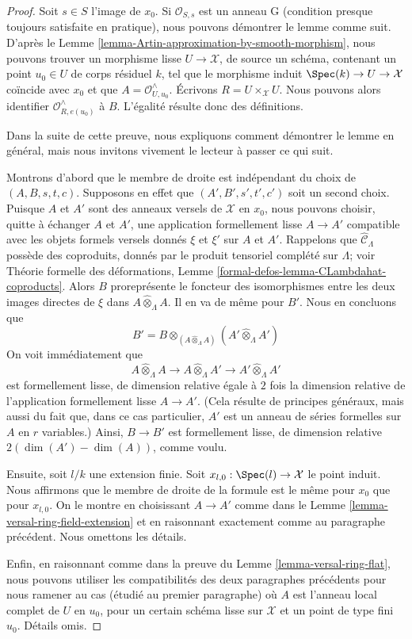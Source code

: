 \begin{proof}
Soit $s \in S$ l'image de $x_0$. Si $\mathcal{O}_{S, s}$
est un anneau G (condition presque toujours satisfaite en pratique),
nous pouvons démontrer le lemme comme suit.
D'après le Lemme \ref{lemma-Artin-approximation-by-smooth-morphism},
nous pouvons trouver un morphisme lisse $U \to \mathcal{X}$, de source un schéma,
contenant un point $u_0 \in U$ de corps résiduel $k$, tel que le
morphisme induit $\Spec(k) \to U \to \mathcal{X}$ coïncide avec $x_0$
et que $A = \mathcal{O}_{U, u_0}^\wedge$.
Écrivons $R = U \times_\mathcal{X} U$. Nous pouvons alors identifier
$\mathcal{O}_{R, e(u_0)}^\wedge$ à $B$.
L'égalité résulte donc des définitions.

\medskip\noindent
Dans la suite de cette preuve, nous expliquons comment démontrer le lemme en
général, mais nous invitons vivement le lecteur à passer ce qui suit.

\medskip\noindent
Montrons d'abord que le membre de droite est indépendant du choix
de $(A, B, s, t, c)$. Supposons en effet que $(A', B', s', t', c')$
soit un second choix. Puisque $A$ et $A'$ sont des anneaux versels de $\mathcal{X}$
en $x_0$, nous pouvons choisir, quitte à échanger $A$ et $A'$,
une application formellement lisse $A \to A'$ compatible avec les objets formels
versels donnés $\xi$ et $\xi'$ sur $A$ et $A'$.
Rappelons que $\widehat{\mathcal{C}}_\Lambda$ possède
des coproduits, donnés par le produit tensoriel complété
sur $\Lambda$; voir Théorie formelle des déformations, Lemme
\ref{formal-defos-lemma-CLambdahat-coproducts}.
Alors $B$ proreprésente le foncteur des isomorphismes entre les
deux images directes de $\xi$ dans $A \widehat{\otimes}_\Lambda A$.
Il en va de même pour $B'$. Nous en concluons que
$$
B' =
B \otimes_{(A \widehat{\otimes}_\Lambda A)}
(A' \widehat{\otimes}_\Lambda A')
$$
On voit immédiatement que
$$
A \widehat{\otimes}_\Lambda A \longrightarrow
A \widehat{\otimes}_\Lambda A' \longrightarrow
A' \widehat{\otimes}_\Lambda A'
$$
est formellement lisse, de dimension relative égale à $2$ fois la
dimension relative de l'application formellement lisse $A \to A'$.
(Cela résulte de principes généraux, mais aussi du fait que,
dans ce cas particulier, $A'$ est un anneau de séries formelles sur $A$
en $r$ variables.) Ainsi, $B \to B'$ est formellement lisse, de
dimension relative $2(\dim(A') - \dim(A))$, comme voulu.

\medskip\noindent
Ensuite, soit $l/k$ une extension finie. Soit
$x_{l, 0} : \Spec(l) \to \mathcal{X}$
le point induit. Nous affirmons que le membre de droite de la formule
est le même pour $x_0$ que pour $x_{l, 0}$.
On le montre en choisissant $A \to A'$ comme dans le
Lemme \ref{lemma-versal-ring-field-extension}
et en raisonnant exactement comme au paragraphe précédent.
Nous omettons les détails.

\medskip\noindent
Enfin, en raisonnant comme dans la preuve du Lemme \ref{lemma-versal-ring-flat},
nous pouvons utiliser les compatibilités des deux paragraphes précédents
pour nous ramener au cas (étudié au premier paragraphe)
où $A$ est l'anneau local complet de $U$ en $u_0$, pour un certain
schéma lisse sur $\mathcal{X}$ et un point de type fini $u_0$.
Détails omis.
\end{proof}












